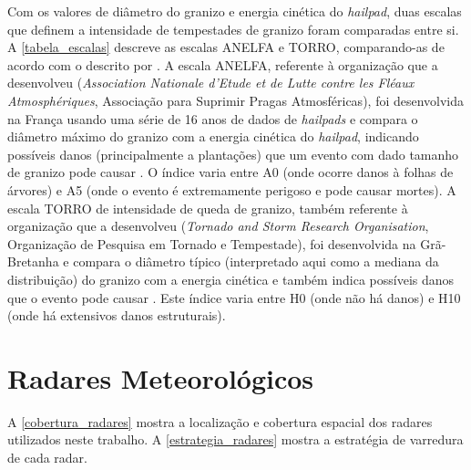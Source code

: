 Com os valores de diâmetro do granizo e energia cinética do \textit{hailpad}, duas escalas que definem a intensidade de tempestades de granizo foram comparadas entre si. A \autoref{tabela_escalas} descreve as escalas ANELFA e TORRO, comparando-as de acordo com o descrito por . A escala ANELFA, referente à organização que a desenvolveu (\textit{Association Nationale d'Etude et de Lutte contre les Fléaux Atmosphériques}, Associação para Suprimir Pragas Atmosféricas), foi desenvolvida na França usando uma série de 16 anos de dados de \textit{hailpads} e compara o diâmetro máximo do granizo com a energia cinética do \textit{hailpad}, indicando possíveis danos (principalmente a plantações) que um evento com dado tamanho de granizo pode causar \cite{Dessens2007}. O índice varia entre A0 (onde ocorre danos à folhas de árvores) e A5 (onde o evento é extremamente perigoso e pode causar mortes). A escala TORRO de intensidade de queda de granizo, também referente à organização que a desenvolveu (\textit{Tornado and Storm Research Organisation}, Organização de Pesquisa em Tornado e Tempestade), foi desenvolvida na Grã-Bretanha e compara o diâmetro típico (interpretado aqui como a mediana da distribuição) do granizo com a energia cinética e também indica possíveis danos que o evento pode causar \cite{webb1986}. Este índice varia entre H0 (onde não há danos) e H10 (onde há extensivos danos estruturais).



\section{Radares Meteorológicos}\label{radar}

A \autoref{cobertura_radares} mostra a localização e cobertura espacial dos radares utilizados neste trabalho. A \autoref{estrategia_radares} mostra a estratégia de varredura de cada radar.

